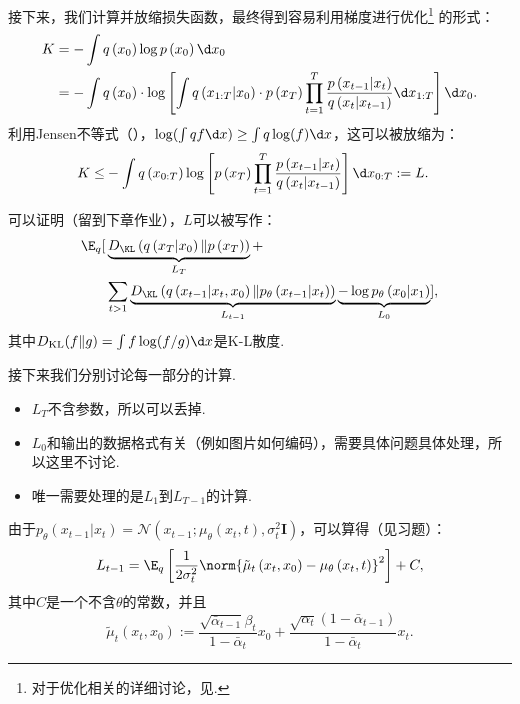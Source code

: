 接下来，我们计算并放缩损失函数，最终得到容易利用梯度进行优化\footnote{对于优化相关的详细讨论，见. }
    的形式：
\[
\begin{aligned}
    K & =-\int q\left(x_{0}\right) \log p\left(x_{0}\right) \d x_{0} \\
    & =-\int q\left(x_{0}\right) \cdot \log \left[\int q\left(x_{1:T} | x_{0}\right) \cdot p\left(x_{T}\right) \prod_{t=1}^T \frac{p\left(x_{t-1} | x_{t}\right)}{q\left(x_{t} | x_{t-1}\right)}\d x_{1:T}\right]\d x_{0}.
\end{aligned}
\]
利用Jensen不等式（），$\log(\int q f\d x)\geq\int q\log(f)\d x$，这可以被放缩为：
\[
\begin{aligned}
    K \leq & -\int q\left(x_{0:T}\right) \log \left[p\left(x_{T}\right) \prod_{t=1}^T \frac{p\left(x_{t-1} | x_{t}\right)}{q\left(x_{t} | x_{t-1}\right)}\right] \d x_{0:T}:=L.
\end{aligned}
\]

可以证明（留到下章作业），$L$可以被写作：
\[
\begin{aligned}
    \E_q[&\underbrace{D_{\KL}\left(q\left(x_T | x_0\right) \| p\left(x_T\right)\right)}_{L_T}+\\
    &\sum_{t>1} \underbrace{D_{\KL}\left(q\left(x_{t-1} | x_t, x_0\right) \| p_\theta\left(x_{t-1} | x_t\right)\right)}_{L_{t-1}} \underbrace{-\log p_\theta\left(x_0 | x_1\right)}_{L_0}],
\end{aligned}
\]
其中$D_{\mathrm{KL}}(f\|g)=\int f\log(f/g)\d x$是K-L散度. 

接下来我们分别讨论每一部分的计算. 
\begin{itemize}
    \item $L_T$不含参数，所以可以丢掉. 
    \item $L_0$和输出的数据格式有关（例如图片如何编码），需要具体问题具体处理，所以这里不讨论. 
    \item 唯一需要处理的是$L_1$到$L_{T-1}$的计算. 
\end{itemize}

由于$p_\theta\left(x_{t-1}|x_t\right)=\mathcal{N}\left(x_{t-1} ; \mu_\theta\left(x_t, t\right), \sigma_t^2 \mathbf{I}\right)$，可以算得（见习题）：
\[
L_{t-1}=\E_q\left[\frac{1}{2 \sigma_t^2}\norm{\tilde{\mu}_t\left(x_t, x_0\right)-\mu_\theta\left(x_t, t\right)}^2\right]+C,
\]
其中$C$是一个不含$\theta$的常数，并且
\[
\tilde{\mu}_t\left(x_t, x_0\right):=\frac{\sqrt{\bar{\alpha}_{t-1}} \beta_t}{1-\bar{\alpha}_t} x_0+\frac{\sqrt{\alpha_t}\left(1-\bar{\alpha}_{t-1}\right)}{1-\bar{\alpha}_t} x_t.
\]

